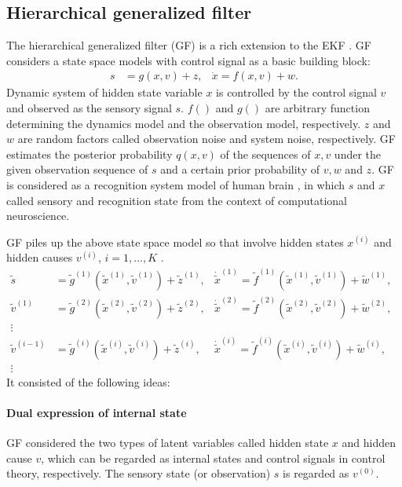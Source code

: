 \documentclass{article}
\begin{document}
\subsection{Hierarchical generalized filter}
The hierarchical generalized filter (GF) is a rich extension to the EKF \cite{GF}.
GF considers a state space models with control signal as a basic building block:
\begin{align*}
s &= g(x,v)+z,& \dot{x} = f(x,v)+w.
\end{align*}
Dynamic system of hidden state variable $x$
is controlled by the control signal $v$
and observed as the sensory signal $s$.
$f()$ and $g()$ are arbitrary function determining
the dynamics model and the observation model, respectively.
$z$ and $w$ are random factors called
observation noise and system noise, respectively.
GF estimates the posterior probability $q(x,v)$
of the sequences of $x,v$ under the given observation sequence of $s$
and a certain prior probability of $v,w$ and $z$.
GF is considered as a recognition system model of human brain \cite{GFGF},
in which $s$ and $x$ called sensory and recognition state
from the context of computational neuroscience.

GF piles up the above state space model 
so that involve hidden states
$x^{(i)}$ and hidden causes $v^{(i)}$, $i=1,...,K$
\cite{Generalized_filter}.
\begin{align}
 \tilde{s} &= \tilde{g}^{(1)}( \tilde{x}^{(1)}, \tilde{v}^{(1)}  ) + \tilde{z}^{(1)},
 &
 \dot{\tilde{x}}^{(1)} = \tilde{f}^{(1)}( \tilde{x}^{(1)}, \tilde{v}^{(1)}  ) + \tilde{w}^{(1)},\\
 \tilde{v}^{(1)} &= \tilde{g}^{(2)}( \tilde{x}^{(2)}, \tilde{v}^{(2)}  ) + \tilde{z}^{(2)},
 &
 \dot{\tilde{x}}^{(2)} = \tilde{f}^{(2)}( \tilde{x}^{(2)}, \tilde{v}^{(2)}  ) + \tilde{w}^{(2)},\\
 \vdots&&&\\
 \tilde{v}^{(i-1)} &= \tilde{g}^{(i)}( \tilde{x}^{(i)}, \tilde{v}^{(i)}  ) + \tilde{z}^{(i)},
 &
 \dot{\tilde{x}}^{(i)} = \tilde{f}^{(i)}( \tilde{x}^{(i)}, \tilde{v}^{(i)}  ) + \tilde{w}^{(i)},\\
 \vdots&&&
\end{align}
It consisted of the following ideas:
\paragraph{Dual expression of internal state}
GF considered the two types of latent variables called hidden state $x$ and hidden cause $v$,
which can be regarded as internal states and control signals in control theory, respectively.
The sensory state (or observation) $s$ is regarded as $v^{(0)}$.
\end{document}
